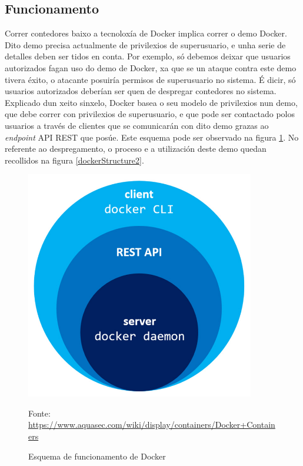 \subsection{Funcionamento}

Correr contedores baixo a tecnoloxía de Docker implica correr o demo Docker. Dito demo precisa actualmente de privilexios de superusuario, e unha serie de detalles deben ser tidos en conta. Por exemplo, só debemos deixar que usuarios autorizados fagan uso do demo de Docker, xa que se un ataque contra este demo tivera éxito, o atacante posuiría permisos de superusuario no sistema. É dicir, só usuarios autorizados deberían ser quen de despregar contedores no sistema.\\

Explicado dun xeito sinxelo, Docker basea o seu modelo de privilexios nun demo, que debe correr con privilexios de superusuario, e que pode ser contactado polos usuarios a través de clientes que se comunicarán con dito demo grazas ao \textit{endpoint} \gls{API} \gls{REST} que posúe. Este esquema pode ser observado na figura \ref{dockerStructure}. No referente ao despregamento, o proceso e a utilización deste demo quedan recollidos na figura \ref{dockerStructure2}.\\

\begin{figure}
\centerline{\includegraphics[width=10cm]{figuras/dockerStructure}}
\caption{Esquema de funcionamento de Docker}
\medskip
\small
\centerline{Fonte: \url{https://www.aquasec.com/wiki/display/containers/Docker+Containers}}
\label{dockerStructure}
\end{figure}

